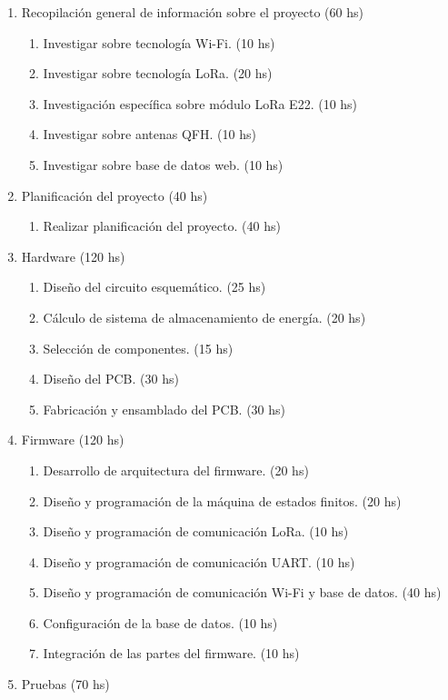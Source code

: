 \documentclass[
11pt, %
codirector, %
]{charter}
\begin{document}
\begin{enumerate}
\item Recopilación general de información sobre el proyecto (60 hs)
	\begin{enumerate}
	\item Investigar sobre tecnología Wi-Fi. (10 hs)
	\item Investigar sobre tecnología LoRa. (20 hs)
	\item Investigación específica sobre módulo LoRa E22. (10 hs)
	\item Investigar sobre antenas QFH. (10 hs)
	\item Investigar sobre base de datos web. (10 hs)
	\end{enumerate}
\item Planificación del proyecto (40 hs)
	\begin{enumerate}
	\item Realizar planificación del proyecto. (40 hs)
	\end{enumerate}
\item Hardware (120 hs)
	\begin{enumerate}
	\item Diseño del circuito esquemático. (25 hs)
	\item Cálculo de sistema de almacenamiento de energía. (20 hs)
	\item Selección de componentes. (15 hs)
	\item Diseño del PCB. (30 hs)
	\item Fabricación y ensamblado del PCB. (30 hs)
	\end{enumerate}
\item Firmware (120 hs)
	\begin{enumerate}
	\item Desarrollo de arquitectura del firmware. (20 hs)
	\item Diseño y programación de la máquina de estados finitos. (20 hs)
	\item Diseño y programación de comunicación LoRa. (10 hs)
	\item Diseño y programación de comunicación UART. (10 hs)
	\item Diseño y programación de comunicación Wi-Fi y base de datos. (40 hs)
	\item Configuración de la base de datos. (10 hs)
	\item Integración de las partes del firmware. (10 hs)
	\end{enumerate}
\item Pruebas (70 hs)
	\begin{enumerate}

\end{enumerate}
\end{enumerate}
\end{document}

